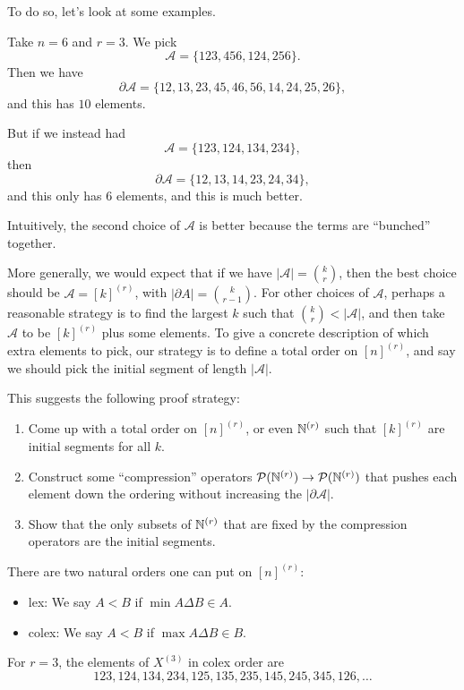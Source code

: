 \documentclass[a4paper]{article}
\begin{document}
To do so, let's look at some examples.
\begin{eg}
  Take $n = 6$ and $r = 3$. We pick
  \[
    \mathcal{A} = \{123, 456, 124, 256\}.
  \]
  Then we have
  \[
    \partial \mathcal{A} = \{12, 13, 23, 45, 46, 56, 14, 24, 25, 26\},
  \]
  and this has $10$ elements.

  But if we instead had
  \[
    \mathcal{A} = \{123, 124, 134, 234\},
  \]
  then
  \[
    \partial \mathcal{A} = \{12, 13, 14, 23, 24, 34\},
  \]
  and this only has $6$ elements, and this is much better.
\end{eg}
Intuitively, the second choice of $\mathcal{A}$ is better because the terms are ``bunched'' together.

More generally, we would expect that if we have $|\mathcal{A}| = \binom{k}{r}$, then the best choice should be $\mathcal{A} = [k]^{(r)}$, with $|\partial A| = \binom{k}{r - 1}$. For other choices of $\mathcal{A}$, perhaps a reasonable strategy is to find the largest $k$ such that $\binom{k}{r} < |\mathcal{A}|$, and then take $\mathcal{A}$ to be $[k]^{(r)}$ plus some elements. To give a concrete description of which extra elements to pick, our strategy is to define a total order on $[n]^{(r)}$, and say we should pick the initial segment of length $|\mathcal{A}|$.

This suggests the following proof strategy:
\begin{enumerate}
  \item Come up with a total order on $[n]^{(r)}$, or even $\mathbb{N}^{(r)}$ such that $[k]^{(r)}$ are initial segments for all $k$.
  \item Construct some ``compression'' operators $\mathcal{P}(\mathbb{N}^{(r)}) \to \mathcal{P}(\mathbb{N}^{(r)})$ that pushes each element down the ordering without increasing the $|\partial \mathcal{A}|$.
  \item Show that the only subsets of $\mathbb{N}^{(r)}$ that are fixed by the compression operators are the initial segments.
\end{enumerate}
There are two natural orders one can put on $[n]^{(r)}$:
\begin{itemize}
  \item lex: We say $A < B$ if $\min A \Delta B \in A$.
  \item colex: We say $A < B$ if $\max A \Delta B \in B$.
\end{itemize}
\begin{eg}
  For $r = 3$, the elements of $X^{(3)}$ in colex order are
  \[
    123, 124, 134, 234, 125, 135, 235, 145, 245, 345, 126,\ldots
  \]
\end{eg}
\end{document}

